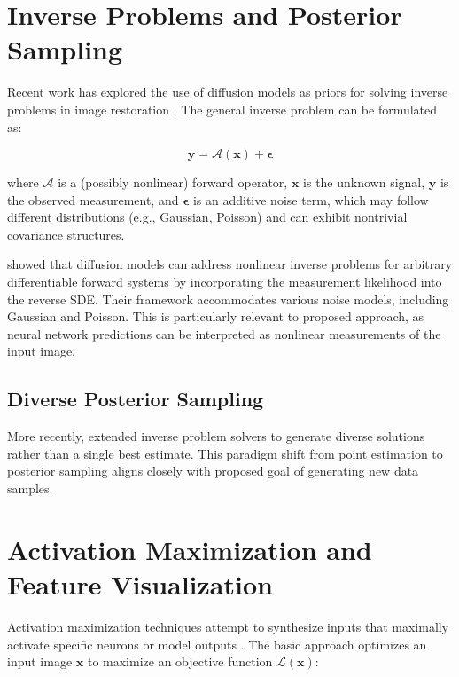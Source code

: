 \documentclass[licencjacka,en]{pracamgr}
\begin{document}
\section{Inverse Problems and Posterior Sampling}

Recent work has explored the use of diffusion models as priors for solving inverse problems in image restoration \citep{song2023pseudoinverse, chung2024diffusionposteriorsamplinggeneral}. The general inverse problem can be formulated as:

\begin{equation}
\mathbf{y} = \mathcal{A}(\mathbf{x}) + \boldsymbol{\epsilon}
\label{eq:inverse_problem}
\end{equation}

where $\mathcal{A}$ is a (possibly nonlinear) forward operator, $\mathbf{x}$ is the unknown signal, $\mathbf{y}$ is the observed measurement, and $\boldsymbol{\epsilon}$ is an additive noise term, which may follow different distributions (e.g., Gaussian, Poisson) and can exhibit nontrivial covariance structures.

\citep{chung2024diffusionposteriorsamplinggeneral} showed that diffusion models can address nonlinear inverse problems for arbitrary differentiable forward systems by incorporating the measurement likelihood into the reverse SDE. Their framework accommodates various noise models, including Gaussian and Poisson. This is particularly relevant to proposed approach, as neural network predictions can be interpreted as nonlinear measurements of the input image.

\subsection{Diverse Posterior Sampling}

More recently, \citep{cohen2024posteriorsamplingmeaningfuldiversity} extended inverse problem solvers to generate diverse solutions rather than a single best estimate. This paradigm shift from point estimation to posterior sampling aligns closely with proposed goal of generating new data samples.

\section{Activation Maximization and Feature Visualization}

Activation maximization techniques attempt to synthesize inputs that maximally activate specific neurons or model outputs \citep{erhan2009visualizing, mordvintsev2015deepdream}. The basic approach optimizes an input image $\mathbf{x}$ to maximize an objective function $\mathcal{L}(\mathbf{x})$:
\end{document}
